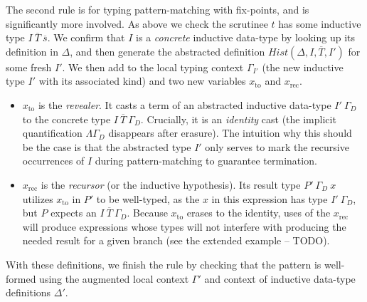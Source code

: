 \documentclass{article}
\newcommand{\vars}[1]{{\overline{#1}}}
\begin{document}
The second rule is for typing pattern-matching with fix-points, and is
significantly more involved. As above we check the scrutinee $t$ has some
inductive type $I\ \vars{T}\ \vars{s}$. We confirm that $I$ is a
\textit{concrete} inductive data-type by looking up its definition in $\Delta$,
and then generate the abstracted definition $Hist(\Delta,I,\vars{T},I')$ for some fresh
$I'$. We then add to the local typing context $\Gamma_{I'}$ (the new inductive
type $I'$ with its associated kind) and two new variables $x_{\text{to}}$ and
$x_{\text{rec}}$.

\begin{itemize}
\item $x_{\text{to}}$ is the \textit{revealer}. It casts a term of an abstracted inductive
  data-type $I'\ \Gamma_D$ to the concrete type $I\ \vars{T}\ \Gamma_D$.
  Crucially, it is an \textit{identity} cast (the implicit quantification
  $\Lambda \Gamma_D$ disappears after erasure). The intuition why this should be
  the case is that the abstracted type $I'$ only serves to mark the recursive
  occurrences of $I$ during pattern-matching to guarantee termination.
\item $x_{\text{rec}}$ is the \textit{recursor} (or the inductive hypothesis).
  Its result type $P'\ \Gamma_D\ x$ utilizes $x_{\text{to}}$ in $P'$ to be
  well-typed, as the $x$ in this expression has type $I'\ \Gamma_D$, but $P$
  expects an $I\ \vars{T}\ \Gamma_D$. Because $x_{\text{to}}$ erases to the identity, uses of the
  $x_{\text{rec}}$ will produce expressions whose types will not interfere with
  producing the needed result for a given branch (see the extended example --
  TODO).
\end{itemize}

\noindent With these definitions, we finish the rule by checking that the
pattern is well-formed using the augmented local context $\Gamma'$ and context
of inductive data-type definitions $\Delta'$.



\end{document}
